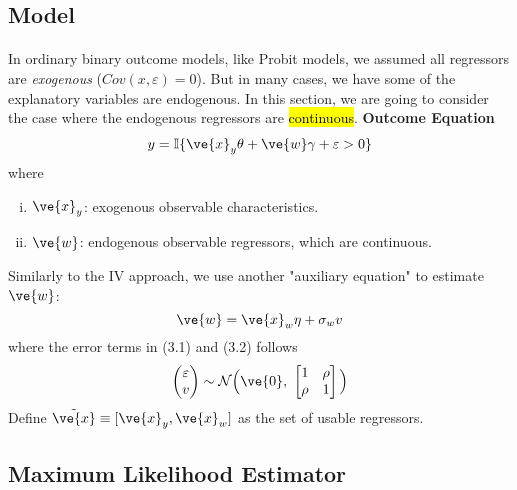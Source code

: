 \documentclass[11pt]{article}
\begin{document}
		\subsection{Model}
			\paragraph{}In ordinary binary outcome models, like Probit models, we assumed all regressors are \emph{exogenous} ($Cov(x, \varepsilon) = 0$). But in many cases, we have some of the explanatory variables are endogenous. In this section, we are going to consider the case where the endogenous regressors are \hl{continuous}.
			\textbf{Outcome Equation}
			\begin{gather}
				y = \mathbb{I}\{\ve{x}_y \theta + \ve{w} \gamma + \varepsilon > 0\}
			\end{gather}
			where 
			\begin{enumerate}[(i)]
				\item $\ve{x}_y$: exogenous observable characteristics.
				\item $\ve{w}$: endogenous observable regressors, which are continuous.
			\end{enumerate}
			Similarly to the IV approach, we use another "auxiliary equation" to estimate $\ve{w}$:
			\begin{equation}
				\ve{w} = \ve{x}_w \eta + \sigma_w v
			\end{equation}
			where the error terms in (3.1) and (3.2) follows
			\begin{equation}
				\begin{pmatrix} \varepsilon \\ v \end{pmatrix}
				\sim \mc{N}
				\Big(
				\ve{0},\ 
				\begin{bmatrix}1 & \rho \\ 
				\rho & 1\end{bmatrix}
				\Big)
			\end{equation}
			Define $\tilde{\ve{x}} \equiv [\ve{x}_y, \ve{x}_w]$ as the set of usable regressors.
		\subsection{Maximum Likelihood Estimator}
\end{document}
